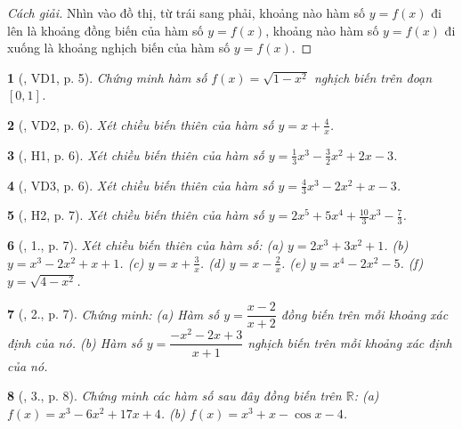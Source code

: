 \documentclass{article}
\newtheorem{baitoan}{}
\begin{document}
\begin{proof}[Cách giải]
	Nhìn vào đồ thị, từ trái sang phải, khoảng nào hàm số $y = f(x)$ đi lên là khoảng đồng biến của hàm số $y = f(x)$, khoảng nào hàm số $y = f(x)$ đi xuống là khoảng nghịch biến của hàm số $y = f(x)$.
\end{proof}

\begin{baitoan}[\cite{SGK_Toan_12_giai_tich_nang_cao}, VD1, p. 5]
	Chứng minh hàm số $f(x) = \sqrt{1 - x^2}$ nghịch biến trên đoạn $[0,1]$.
\end{baitoan}

\begin{baitoan}[\cite{SGK_Toan_12_giai_tich_nang_cao}, VD2, p. 6]
	Xét chiều biến thiên của hàm số $y = x + \frac{4}{x}$.
\end{baitoan}

\begin{baitoan}[\cite{SGK_Toan_12_giai_tich_nang_cao}, H1, p. 6]
	Xét chiều biến thiên của hàm số $y = \frac{1}{3}x^3 - \frac{3}{2}x^2 + 2x - 3$.
\end{baitoan}

\begin{baitoan}[\cite{SGK_Toan_12_giai_tich_nang_cao}, VD3, p. 6]
	Xét chiều biến thiên của hàm số $y = \frac{4}{3}x^3 - 2x^2 + x - 3$.
\end{baitoan}

\begin{baitoan}[\cite{SGK_Toan_12_giai_tich_nang_cao}, H2, p. 7]
	Xét chiều biến thiên của hàm số $y = 2x^5 + 5x^4 + \frac{10}{3}x^3 - \frac{7}{3}$.
\end{baitoan}

\begin{baitoan}[\cite{SGK_Toan_12_giai_tich_nang_cao}, 1., p. 7]
	Xét chiều biến thiên của hàm số: (a) $y = 2x^3 + 3x^2 + 1$. (b) $y = x^3 - 2x^2 + x + 1$. (c) $y = x + \frac{3}{x}$. (d) $y = x - \frac{2}{x}$. (e) $y = x^4 - 2x^2 - 5$. (f) $y = \sqrt{4 - x^2}$.
\end{baitoan}

\begin{baitoan}[\cite{SGK_Toan_12_giai_tich_nang_cao}, 2., p. 7]
	Chứng minh: (a) Hàm số $y = \dfrac{x - 2}{x + 2}$ đồng biến trên mỗi khoảng xác định của nó. (b) Hàm số $y = \dfrac{-x^2 - 2x + 3}{x + 1}$ nghịch biến trên mỗi khoảng xác định của nó.
\end{baitoan}

\begin{baitoan}[\cite{SGK_Toan_12_giai_tich_nang_cao}, 3., p. 8]
	Chứng minh các hàm số sau đây đồng biến trên $\mathbb{R}$: (a) $f(x) = x^3 - 6x^2 + 17x + 4$. (b) $f(x) = x^3 + x - \cos x - 4$.
\end{baitoan}
\end{document}
